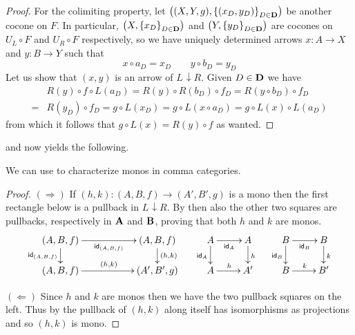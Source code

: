 \documentclass[3p]{elsarticle}
\def\B{\textbf {\textup{B}}}
\def\D{\textbf {\textup{D}}}
\def\A{\textbf {\textup{A}}}
\renewcommand{\comma}[2]{#1\hspace{1pt} {\downarrow}#2}
\newcommand{\id}[1]{\mathsf{id}_{#1}}
\theoremstyle{remark}
\theoremstyle{definition}
\begin{document}
\begin{proof}
	For the colimiting property, let $\left((X, Y, g), \left\{\left(x_D, y_D\right)\right\}_{D\in \D}\right)$ be another cocone on $F$. In particular, $\left(X, \left\{x_D\right\}_{D\in \D}\right)$ and $\left(Y, \left\{y_D\right\}_{D\in \D}\right)$ are cocones on $U_L\circ F$ and $U_R\circ F$ respectively, so we have uniquely determined arrows $x\colon A\rightarrow X$ and $y\colon B\rightarrow Y$ such that 
	\[x\circ a_D= x_D \qquad y\circ b_D= y_D\]
	Let us show that $(x,y)$ is an arrow of $\comma{L}{R}$. Given $D\in \D$ we have
	\begin{align*}
		&R(y)\circ f\circ L(a_D)=R(y)\circ R\left(b_D\right)\circ f_D=R\left(y\circ b_D\right)\circ f_D\\=&R\left(y_D\right)\circ f_D= g\circ L\left(x_D\right)=g\circ L\left(x\circ a_D\right)=g\circ L(x)\circ L\left(a_D\right)
	\end{align*}
	from which it follows  that $g\circ L(x)=R(y)\circ f$ as wanted.
\end{proof} 


 and  now yields the following.

We can use  to characterize monos in comma categories. 
\begin{proof}
	$(\Rightarrow)$  If $(h,k)\colon (A,B,f)\to (A', B', g)$ is a mono then the first rectangle below is a pullback in $\comma{L}{R}$. By  then also the other two squares are pullbacks, respectively in $\A$ and $\B$, proving that both $h$ and $k$ are monos.
	\[\xymatrix@R=15pt{(A, B, f)  \ar[rr]_{\id{(A,B,f)}} \ar[d]_{\id{(A,B,f)}}&& (A, B, f)  \ar[d]^{(h,k)}& A \ar[r]_{\id{A}} \ar[d]_{\id{A}} & A \ar[d]^{h} & B \ar[r]_{\id{B}} \ar[d]_{\id{B}} & B  \ar[d]^{k}\\ (A, B, f)  \ar[rr]^{(h,k)}&& (A', B', g) &A \ar[r]^{h} & A' & B \ar[r]^{k} & B'}\]
	\smallskip\noindent
	\begin{minipage}[l]{.3\linewidth}
		 \xymatrix@R=13pt{A \ar[r]_{\id{A}} \ar[d]_{\id{A}} & A \ar[d]^{h} & B \ar[r]_{\id{B}} \ar[d]_{\id{B}} & B  \ar[d]^{k}\\ A \ar[r]^{h} & A' & B \ar[r]^{k} & B'}
	\end{minipage} 
	\hfill
	\begin{minipage}[r]{.65\linewidth}
		$(\Leftarrow)$ Since $h$ and $k$ are monos then we have the two pullback squares on the left. Thus by  the pullback of $(h,k)$ along itself has isomorphisms as projections and so $(h,k)$ is mono. \qedhere
	\end{minipage}
\end{proof}
\end{document}
